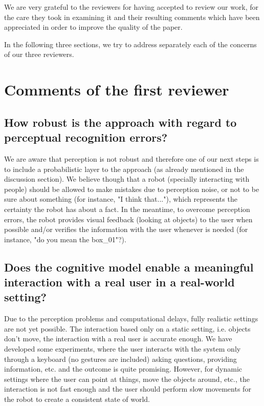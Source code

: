 \documentclass{article}
\begin{document}
We are very grateful to the reviewers for having accepted to review our 
work, for the care they took in examining it and their resulting 
comments which have been appreciated in order to improve the quality of
the paper.

In the following three sections, we try to address separately each of
the concerns of our three reviewers.

\section{Comments of the first reviewer}

\subsection{How robust is the approach with regard to perceptual recognition
errors?}

We are aware that perception is not robust and therefore one of our next steps
is to include a probabilistic layer to the approach (as already mentioned in
the discussion section). We believe though that a robot (specially interacting
with people) should be allowed to make mistakes due to perception noise, or not
to be sure about something (for instance, "I think that..."), which represents
the certainty the robot has about a fact. In the meantime, to overcome
perception errors, the robot provides visual feedback (looking at objects) to
the user when possible and/or verifies the information with the user whenever
is needed (for instance, "do you mean the box\_01"?). 

\subsection{Does the cognitive model enable a meaningful interaction with a
real user in a real-world setting?}

Due to the perception problems and computational delays, fully realistic
settings are not yet possible.  The interaction based only on a static setting,
i.e. objects don't move, the interaction with a real user is accurate enough.
We have developed some experiments, where the user interacts with the system
only through a keyboard (no gestures are included) asking questions, providing
information, etc. and the outcome is quite promising. However, for dynamic
settings where the user can point at things, move the objects around, etc., the
interaction is not fast enough and the user should perform slow movements for
the robot to create a consistent state of world.
\end{document}
